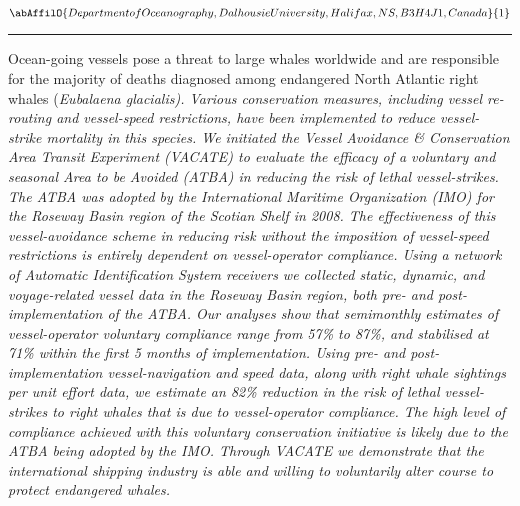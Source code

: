 \begin{minipage}{\linewidth}\begin{center}\begin{minipage}{\linewidth}
   \vspace{2 mm} \begin{center}
    \vspace{2 mm}\begin{center}
  
  $\abAffilO{Department of Oceanography, Dalhousie University, Halifax, NS, B3H 4J1, Canada}{1}$

  \end{center}
  \vspace{2 mm}
  \end{center}\end{minipage}\end{center}
  \begin{center}\rule{0.70\linewidth}{0.5 pt}\end{center}
  \begin{minipage}{\linewidth}
\noindent Ocean-going vessels pose a threat to large whales worldwide and are responsible for the majority of deaths diagnosed among endangered North Atlantic right whales (\sl Eubalaena glacialis\rm). Various conservation measures, including vessel re-routing and vessel-speed restrictions, have been implemented to reduce vessel-strike mortality in this species. We initiated the Vessel Avoidance & Conservation Area Transit Experiment (VACATE) to evaluate the efficacy of a voluntary and seasonal Area to be Avoided (ATBA) in reducing the risk of lethal vessel-strikes. The ATBA was adopted by the International Maritime Organization (IMO) for the Roseway Basin region of the Scotian Shelf in 2008. The effectiveness of this vessel-avoidance scheme in reducing risk without the imposition of vessel-speed restrictions is entirely dependent on vessel-operator compliance.  Using a network of Automatic Identification System receivers we collected static, dynamic, and voyage-related vessel data in the Roseway Basin region, both pre- and post-implementation of the ATBA.  Our analyses show that semimonthly estimates of vessel-operator voluntary compliance range from 57\% to 87\%, and stabilised at 71\% within the first 5 months of implementation.  Using pre- and post-implementation vessel-navigation and speed data, along with right whale sightings per unit effort data, we estimate an 82\% reduction in the risk of lethal vessel-strikes to right whales that is due to vessel-operator compliance. The high level of compliance achieved with this voluntary conservation initiative is likely due to the ATBA being adopted by the IMO. Through VACATE we demonstrate that the international shipping industry is able and willing to voluntarily alter course to protect endangered whales.  
\end{minipage}\end{minipage}
